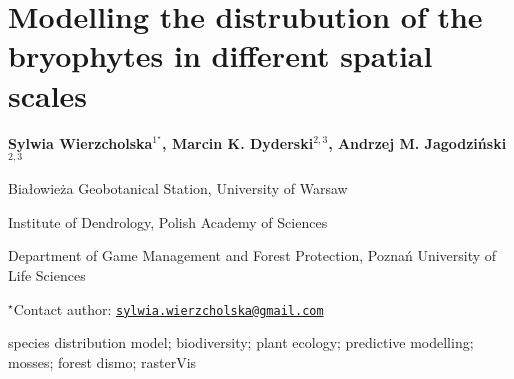 \documentclass[\main/boa.tex]{subfiles}
\begin{document}
\section{Modelling the distrubution of the bryophytes in different spatial scales}

\begin{center}
  {\bf {} Sylwia Wierzcholska$^{1^\star}$,  Marcin K. Dyderski$^{2, 3}$,  Andrzej M. Jagodziński$^{2, 3}$}
\end{center}

\vskip 0.3cm

\begin{affiliations}
\begin{enumerate}
\begin{minipage}{0.915\textwidth}
\centering
\item Białowieża Geobotanical Station, University of Warsaw \\[-2pt]
\item Institute of Dendrology, Polish Academy of Sciences \\[-2pt]
\item Department of Game Management and Forest Protection, Poznań University
of Life Sciences \\[-2pt]
\end{minipage}
\end{enumerate}
$^\star$Contact author: \href{mailto:sylwia.wierzcholska@gmail.com}{\nolinkurl{sylwia.wierzcholska@gmail.com}}\\
\end{affiliations}

\vskip 0.5cm

\begin{minipage}{0.915\textwidth}
\keywords species distribution model; biodiversity; plant ecology; predictive
modelling; mosses; forest
\packages {} dismo;  rasterVis
\end{minipage}

\vskip 0.8cm
\end{document}
